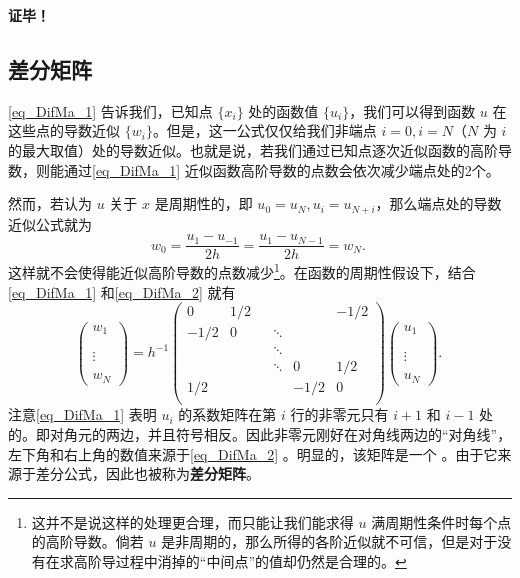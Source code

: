 \textbf{证毕！}

\subsection{差分矩阵}\label{sub_DifMa_1}
\autoref{eq_DifMa_1} 告诉我们，已知点 $\{x_i\}$ 处的函数值 $\{u_i\}$，我们可以得到函数 $u$ 在这些点的导数近似 $\{w_i\}$。但是，这一公式仅仅给我们非端点 $i=0,i=N$（$N$ 为 $i$ 的最大取值）处的导数近似。也就是说，若我们通过已知点逐次近似函数的高阶导数，则能通过\autoref{eq_DifMa_1} 近似函数高阶导数的点数会依次减少端点处的2个。

然而，若认为 $u$ 关于 $x$ 是周期性的，即 $u_0=u_N,u_i=u_{N+i}$，那么端点处的导数近似公式就为
\begin{equation}\label{eq_DifMa_2}
w_0=\frac{u_{1}-u_{-1}}{2h}=\frac{u_{1}-u_{N-1}}{2h}=w_N.~
\end{equation}
这样就不会使得能近似高阶导数的点数减少\footnote{这并不是说这样的处理更合理，而只能让我们能求得 $u$ 满周期性条件时每个点的高阶导数。倘若 $u$ 是非周期的，那么所得的各阶近似就不可信，但是对于没有在求高阶导过程中消掉的“中间点”的值却仍然是合理的。}。在函数的周期性假设下，结合\autoref{eq_DifMa_1} 和\autoref{eq_DifMa_2} 就有
\begin{equation}
\begin{pmatrix}
w_1\\
\\
\\
\vdots\\
\\
w_N
\end{pmatrix}=h^{-1}\begin{pmatrix}
0&1/2&&&&-1/2\\
-1/2&0&&\ddots&&\\
&&&\ddots&&\\
&&&\ddots&0&1/2\\
1/2&&&&-1/2&0\\
\end{pmatrix}\begin{pmatrix}
u_1\\
\\
\\
\vdots\\
\\
u_N
\end{pmatrix}.~
\end{equation}
注意\autoref{eq_DifMa_1} 表明 $u_i$ 的系数矩阵在第 $i$ 行的非零元只有 $i+1$ 和 $i-1$ 处的。即对角元的两边，并且符号相反。因此非零元刚好在对角线两边的“对角线”，左下角和右上角的数值来源于\autoref{eq_DifMa_2} 。明显的，该矩阵是一个 。由于它来源于差分公式，因此也被称为\textbf{差分矩阵}。

